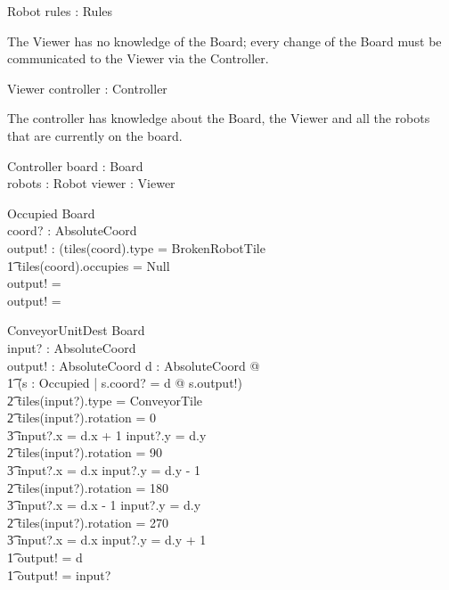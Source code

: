 \documentclass[12pt]{article}
\begin{document}
\begin{schema}{Robot}
rules : Rules
\end{schema}

The Viewer has no knowledge of the Board; every change of the Board must be communicated to the Viewer via the Controller.

\begin{schema}{Viewer}
controller : Controller
\end{schema}

The controller has knowledge about the Board, the Viewer and all the robots that are currently on the board.

\begin{schema}{Controller}
board : Board \\
robots : \power Robot
viewer : Viewer
\end{schema}

\begin{schema}{Occupied}
\Xi Board \\
coord? : AbsoluteCoord \\
output! : \bool
\where
\IF (tiles(coord).type = BrokenRobotTile \; \; \vee \\ \t1
tiles(coord).occupies \not = Null \\
\THEN
output! = \true \\
\ELSE
output! = \false
\end{schema}

\begin{schema}{ConveyorUnitDest}
\Xi Board \\
input? : AbsoluteCoord \\
output! : AbsoluteCoord
\where
\IF \exists d : AbsoluteCoord @ \\ \t1
    (\exists s : Occupied | s.coord? = d @ \neg s.output!) \; \; \wedge \\ \t2
        tiles(input?).type = ConveyorTile \\ \t2
        tiles(input?).rotation = 0 \Rightarrow \\ \t3 input?.x = d.x + 1 \wedge input?.y = d.y \\ \t2
        tiles(input?).rotation = 90 \Rightarrow \\ \t3 input?.x = d.x \wedge input?.y = d.y - 1 \\ \t2
        tiles(input?).rotation = 180 \Rightarrow \\ \t3 input?.x = d.x - 1 \wedge input?.y = d.y \\ \t2
        tiles(input?).rotation = 270 \Rightarrow \\ \t3 input?.x = d.x \wedge input?.y = d.y + 1 \\ \t1
    \THEN output! = d \\ \t1
    \ELSE output! = input?
\end{schema}
\end{document}
